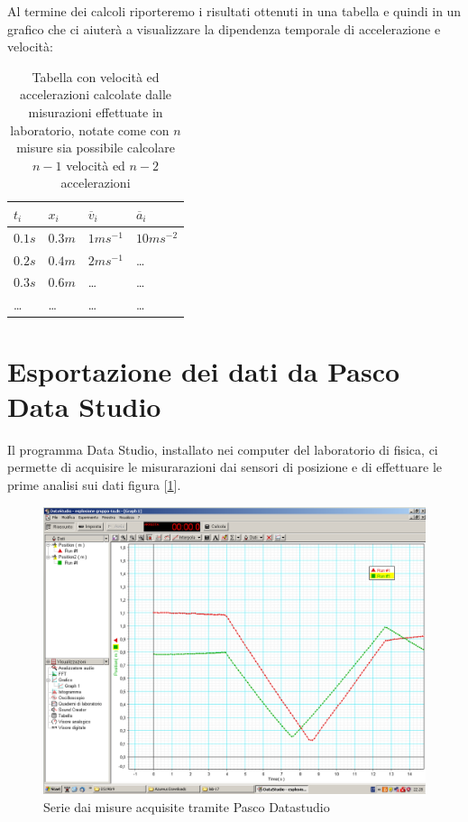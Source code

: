 \documentclass[a4paper,10pt,oneside]{article}
\begin{document}
Al termine dei calcoli riporteremo i risultati ottenuti in una tabella e quindi in un grafico che ci aiuterà a visualizzare la dipendenza temporale di accelerazione  e velocità:
\begin{table}[H]
\begin{center}
\begin{tabular}{llll}\toprule
$t_i$ & $x_i$& $\overline{v}_i$& $\overline{a}_i$ \\ \midrule
$0.1s$&$0.3m$&$1ms^{-1}$&$10ms^{-2}$\\
$0.2s$&$0.4m$&$2ms^{-1}$&\ldots\\
$0.3s$&$0.6m$&\dots&\ldots\\
\ldots &\ldots&\dots&\dots \\ \bottomrule
\end{tabular}\caption{Tabella con velocità ed accelerazioni calcolate dalle misurazioni effettuate in laboratorio, notate come con $n$ misure sia possibile calcolare $n-1$ velocità ed $n-2$ accelerazioni}\label{tab:extab1}
\end{center}
\end{table}



\section{Esportazione dei dati da Pasco Data Studio}
Il programma Data Studio, installato nei computer del laboratorio di fisica, ci permette di acquisire le misurarazioni dai sensori di posizione e di effettuare le prime analisi sui dati figura [\ref{fig:pasco_dati1}].
\begin{figure}[H]
 \centering
 \includegraphics[width=\textwidth]{./pasco2.png}
 \caption{Serie dai misure acquisite tramite Pasco Datastudio}
 \label{fig:pasco_dati1}
\end{figure}
\end{document}
